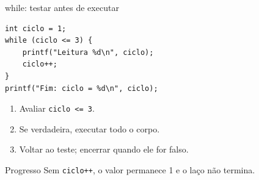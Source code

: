 \begin{frame}[fragile]{while: testar antes de executar}
\begin{lstlisting}
int ciclo = 1;
while (ciclo <= 3) {
    printf("Leitura %d\n", ciclo);
    ciclo++;
}
printf("Fim: ciclo = %d\n", ciclo);
\end{lstlisting}
\begin{enumerate}
\item Avaliar \texttt{ciclo <= 3}.
\item Se verdadeira, executar todo o corpo.
\item Voltar ao teste; encerrar quando ele for falso.
\end{enumerate}
\begin{alertblock}{Progresso}
Sem \texttt{ciclo++}, o valor permanece 1 e o laço não termina.
\end{alertblock}
\end{frame}
